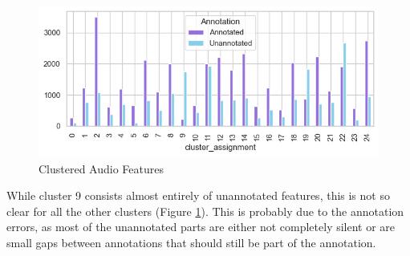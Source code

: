 \begin{figure}[htbp]
    \centering
    \includegraphics[width=0.5\linewidth, height=5cm]{figs/Clustered Audio Features.png}
    \caption{Clustered Audio Features}
    \label{fig:Clustered Audio Features}
\end{figure}

While cluster 9 consists almost entirely of unannotated features, this is not so clear for all the other clusters (Figure \ref{fig:Clustered Audio Features}). This is probably due to the annotation errors, as most of the unannotated parts are either not completely silent or are small gaps between annotations that should still be part of the annotation. 

